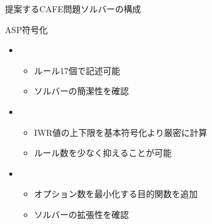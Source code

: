 \documentclass[dvipdfmx, 11pt]{beamer}
\begin{document}
 \begin{frame}{提案するCAFE問題ソルバーの構成}
  \scalebox{0.9}{%
  \centering
  
  }
  \begin{block}{ASP符号化}
   \begin{itemize}
    \item {}
	  \begin{itemize}
	   \item ルール17個で記述可能
	   \item ソルバーの簡潔性を確認
	  \end{itemize}
    \item {}
	  \begin{itemize}
	   \item IWR値の上下限を基本符号化より厳密に計算
	   \item ルール数を少なく抑えることが可能
	  \end{itemize}
    \item {}
	  \begin{itemize}
	   \item オプション数を最小化する目的関数を追加
	   \item ソルバーの拡張性を確認
	  \end{itemize}

	  
   \end{itemize}
  \end{block}

 \end{frame}
\end{document}
